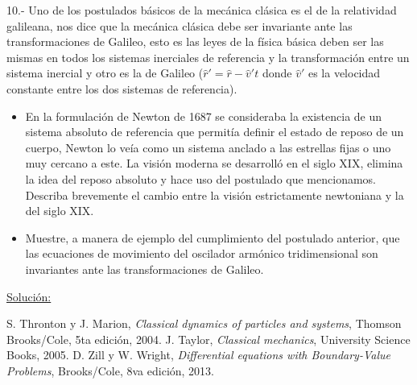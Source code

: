 \documentclass[a4paper,10pt]{article}
\begin{document}
10.- Uno de los postulados básicos de la mecánica clásica es el de la relatividad galileana,
nos dice que la mecánica clásica debe ser invariante ante las transformaciones de Galileo, 
esto es las leyes de la física básica deben ser las mismas en todos los sistemas inerciales
de referencia y la transformación entre un sistema inercial y otro es la de Galileo 
($\hat{r}' = \hat{r} - \hat{v}'t$ donde $\hat{v}'$ es la velocidad constante entre los dos 
sistemas de referencia).

\begin{itemize}
 \item En la formulación de Newton de 1687 se consideraba la existencia de un sistema 
 absoluto de referencia que permitía definir el estado de reposo de un cuerpo, Newton lo
 veía como un sistema anclado a las estrellas fijas o uno muy cercano a este. La visión 
 moderna se desarrolló en el siglo XIX, elimina la idea del reposo absoluto y hace 
 uso del postulado que mencionamos. Describa brevemente el cambio entre la visión 
 estrictamente newtoniana y la del siglo XIX.
 \item Muestre, a manera de ejemplo del cumplimiento del postulado anterior, que las 
 ecuaciones de movimiento del oscilador armónico tridimensional son invariantes ante
 las transformaciones de Galileo.
\end{itemize}

\vspace{.3cm}

\underline{Solución:}

\vspace{.3cm}

\begin{thebibliography}{10}
 S. Thronton y J. Marion, \textit{Classical dynamics of particles and systems}, Thomson Brooks/Cole,
 5ta edición, 2004.
 J. Taylor, \textit{Classical mechanics}, University Science Books, 2005.
 D. Zill y W. Wright, \textit{Differential equations with Boundary-Value Problems}, Brooks/Cole,
 8va edición, 2013.
\end{thebibliography}
\end{document}
